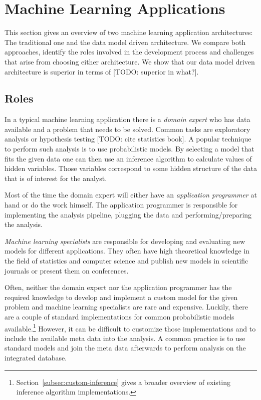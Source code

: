\section{Machine Learning Applications}

This section gives an overview of two machine learning application architectures: The traditional one and the data model driven architecture. We compare both approaches, identify the roles involved in the development process and challenges that arise from choosing either architecture. We show that our data model driven architecture is superior in terms of [TODO: superior in what?].

\subsection{Roles}

In a typical machine learning application there is a \emph{domain expert} who has data available and a problem that needs to be solved. Common tasks are exploratory analysis or hypothesis testing [TODO: cite statistics book]. A popular technique to perform such analysis is to use probabilistic models. By selecting a model that fits the given data one can then use an inference algorithm to calculate values of hidden variables. Those variables correspond to some hidden structure of the data that is of interest for the analyst.

Most of the time the domain expert will either have an \emph{application programmer} at hand or do the work himself. The application programmer is responsible for implementing the analysis pipeline, plugging the data and performing/preparing the analysis.

\emph{Machine learning specialists} are responsible for developing and evaluating new models for different applications. They often have high theoretical knowledge in the field of statistics and computer science and publish new models in scientific journals or present them on conferences.

Often, neither the domain expert nor the application programmer has the required knowledge to develop and implement a custom model for the given problem and machine learning specialists are rare and expensive. Luckily, there are a couple of standard implementations for common probabilistic models available.\footnote{Section~\ref{subsec:custom-inference} gives a broader overview of existing inference algorithm implementations.} However, it can be difficult to customize those implementations and to include the available meta data into the analysis. A common practice is to use standard models and join the meta data afterwards to perform analysis on the integrated database.

